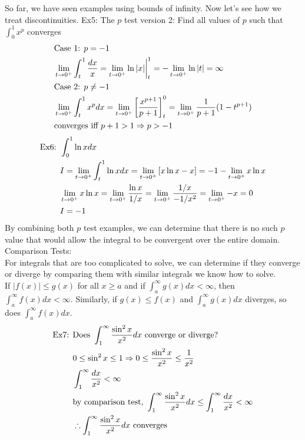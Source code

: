 \documentclass[11pt, fleqn]{article}
\begin{document}
So far, we have seen examples using bounds of infinity. Now let's see how we treat discontinuities.
Ex5: The $p$ test version 2: Find all values of $p$ such that $\int_0^1x^p$ converges
\begin{align*}
    &\text{Case 1: }p=-1\\
    &\lim_{t\to0^+}\int_t^1\frac{dx}{x}=\lim_{t\to0^+}{\ln|x|}\bigg\vert_t^1=-\lim_{t\to0^+}\ln|t|=\infty\\
    &\text{Case 2: }p\neq -1\\
    &\lim_{t\to0^+}\int_t^1x^pdx=\lim_{t\to0^+}\left[ \frac{x^{p+1}}{p+1} \right]_t^0=\lim_{t\to0^+}\frac{1}{p+1}(1-t^{p+1})\\
    &\text{converges iff }p+1>1\Rightarrow p>-1
\end{align*}
\begin{align*}
    \text{Ex6: }&\int_0^1\ln xdx\\
    &I=\lim_{t\to0^+}\int_t^1\ln xdx=\lim_{t\to0^+}\left[ x\ln x-x \right]=-1-\lim_{t\to0^+}x\ln x\\
    &\lim_{t\to0^+}x\ln x=\lim_{t\to0^+}\frac{\ln x}{1/x}=\lim_{t\to0^+}\frac{1/x}{-1/x^2}=\lim_{t\to0^+}-x=0\\
    &I=-1
\end{align*}
By combining both $p$ test examples, we can determine that there is no such $p$ value that would allow the integral to be convergent over the entire domain.\\

Comparison Tests:\\
For integrals that are too complicated to solve, we can determine if they converge or diverge by comparing them with similar integrals we know how to solve.\\
If $|f(x)|\leq g(x)$ for all $x\geq a$ and if $\int_a^\infty g(x)dx<\infty$, then $\int_a^\infty f(x)dx<\infty$. Similarly, if $g(x)\leq f(x)$ and $\int_a^\infty g(x)dx$ diverges, so does $\int_a^\infty f(x)dx$.
\begin{align*}
    \text{Ex7: }&\text{Does }\int_1^\infty\frac{\sin^2x}{x^2}dx\text{ converge or diverge?}\\
    &0\leq\sin^2x\leq 1\Rightarrow 0\leq \frac{\sin^2x}{x^2}\leq\frac{1}{x^2}\\
    &\int_1^\infty\frac{dx}{x^2}<\infty\\
    &\text{by comparison test, }\int_1^\infty\frac{\sin^2x}{x^2}dx\leq\int_1^\infty\frac{dx}{x^2}<\infty\\
    &\therefore \int_1^\infty\frac{\sin^2x}{x^2}dx\text{ converges}
\end{align*}
\end{document}

